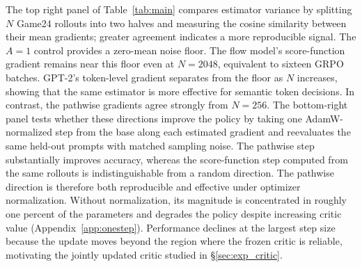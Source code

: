 The top right panel of Table~\ref{tab:main} compares estimator variance by splitting $N$ Game24 rollouts into two halves and measuring the cosine similarity between their mean gradients; greater agreement indicates a more reproducible signal. The $A{=}1$ control provides a zero-mean noise floor. The flow model's score-function gradient remains near this floor even at $N{=}2048$, equivalent to sixteen GRPO batches. GPT-2's token-level gradient separates from the floor as $N$ increases, showing that the same estimator is more effective for semantic token decisions. In contrast, the pathwise gradients agree strongly from $N{=}256$. The bottom-right panel tests whether these directions improve the policy by taking one AdamW-normalized step from the base along each estimated gradient and reevaluates the same held-out prompts with matched sampling noise. The pathwise step substantially improves accuracy, whereas the score-function step computed from the same rollouts is indistinguishable from a random direction. The pathwise direction is therefore both reproducible and effective under optimizer normalization. Without normalization, its magnitude is concentrated in roughly one percent of the parameters and degrades the policy despite increasing critic value (Appendix~\ref{app:onestep}). Performance declines at the largest step size because the update moves beyond the region where the frozen critic is reliable, motivating the jointly updated critic studied in \S\ref{sec:exp_critic}.

